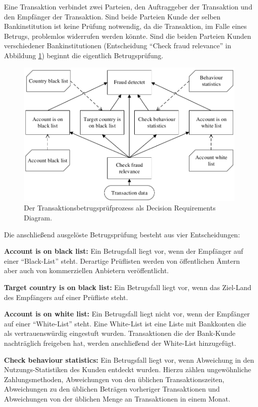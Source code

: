 Eine Transaktion verbindet zwei Parteien, den Auftraggeber der Transaktion und den Empfänger der Transaktion. Sind beide Parteien Kunde der selben Bankinstitution ist keine Prüfung notwendig, da die Transaktion, im Falle eines Betrugs, problemlos widerrufen werden könnte. Sind die beiden Parteien Kunden verschiedener Bankinstitutionen (Entscheidung "`Check fraud relevance"' in Abbildung \ref{fig:fraud-dmn}) beginnt die eigentlich Betrugsprüfung.  

\begin{figure}[ht]
\centering
\includegraphics{images/fraud-dmn.pdf}
\caption{Der Transaktionsbetrugsprüfprozess als Decision Requirements Diagram.}
\label{fig:fraud-dmn}
\end{figure}

Die anschließend ausgelöste Betrugsprüfung besteht aus vier Entscheidungen:

\begin{itemize*}
\item \textbf{Account is on black list:} Ein Betrugsfall liegt vor, wenn der Empfänger auf einer "`Black-List"' steht. Derartige Prüflisten werden von öffentlichen Ämtern aber auch von kommerziellen Anbietern veröffentlicht. 
\item \textbf{Target country is on black list:} Ein Betrugsfall liegt vor, wenn das Ziel-Land des Empfängers auf einer Prüfliste steht. 
\item \textbf{Account is on white list:} Ein Betrugsfall liegt nicht vor, wenn der Empfänger auf einer "`White-List"' steht. Eine White-List ist eine Liste mit Bankkonten die als vertrauenswürdig eingestuft wurden. Transaktionen die der Bank-Kunde nachträglich freigeben hat, werden anschließend der White-List hinzugefügt.
\item \textbf{Check behaviour statistics:} Ein Betrugsfall liegt vor, wenn Abweichung in den Nutzungs-Statistiken des Kunden entdeckt wurden. Hierzu zählen ungewöhnliche Zahlungsmethoden, Abweichungen von den üblichen Transaktionszeiten, Abweichungen zu den üblichen Beträgen vorheriger Transaktionen und Abweichungen von der üblichen Menge an Transaktionen in einem Monat. 
\end{itemize*}


